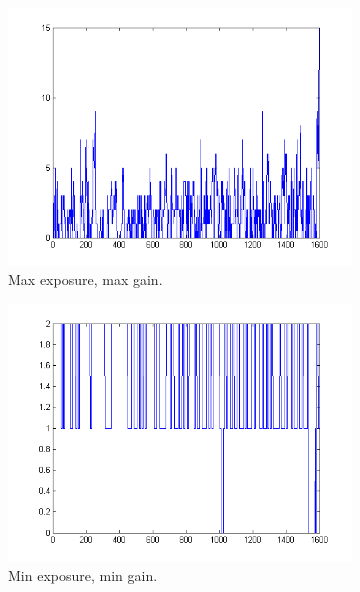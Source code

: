 \documentclass[a4paper, 12pt]{paper}
\begin{document}
\begin{figure}[H]
    \centering
    \begin{subfigure}[b]{0.45\textwidth}
        \includegraphics[width=\textwidth]{img/plot_black_a}
        \caption{Max exposure, max gain.}
    \end{subfigure}
    \begin{subfigure}[b]{0.45\textwidth}
        \includegraphics[width=\textwidth]{img/plot_black_b}
        \caption{Min exposure, min gain.}
    \end{subfigure}
    \begin{subfigure}[b]{0.45\textwidth}

\end{subfigure}
\end{figure}
\end{document}
